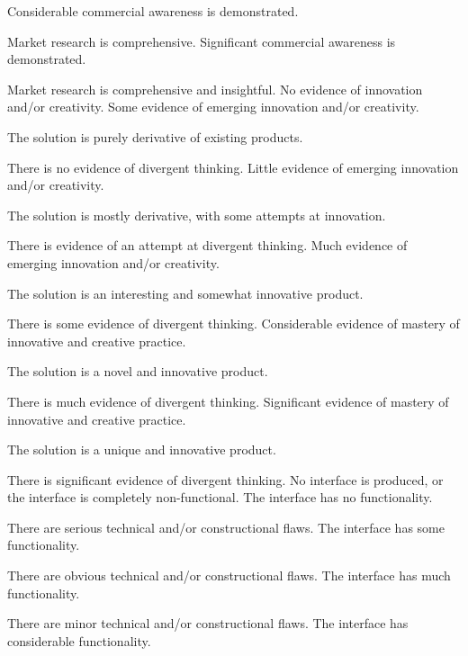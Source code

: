 \documentclass{../fal_assignment}
\begin{document}
\begin{markingrubric}
        \grade Considerable commercial awareness is demonstrated.
            \par Market research is comprehensive.
        \grade Significant commercial awareness is demonstrated.
            \par Market research is comprehensive and insightful.
%
        \grade\fail No evidence of innovation and/or creativity.
        \grade Some evidence of emerging innovation and/or creativity.
            \par The solution is purely derivative of existing products.
            \par There is no evidence of divergent thinking.
        \grade Little evidence of emerging innovation and/or creativity.
            \par The solution is mostly derivative, with some attempts at innovation.
            \par There is evidence of an attempt at divergent thinking.
        \grade Much evidence of emerging innovation and/or creativity.
            \par The solution is an interesting and somewhat innovative product.
            \par There is some evidence of divergent thinking.
        \grade Considerable evidence of mastery of innovative and creative practice.
            \par The solution is a novel and innovative product.
            \par There is much evidence of divergent thinking.
        \grade Significant evidence of mastery of innovative and creative practice.
            \par The solution is a unique and innovative product.
            \par There is significant evidence of divergent thinking.
%            
        \grade\fail No interface is produced, or the interface is completely non-functional.
        \grade The interface has no functionality.
            \par There are serious technical and/or constructional flaws.
        \grade The interface has some functionality.
            \par There are obvious technical and/or constructional flaws.
        \grade The interface has much functionality.
            \par There are minor technical and/or constructional flaws.
        \grade The interface has considerable functionality.

\end{markingrubric}
\end{document}
